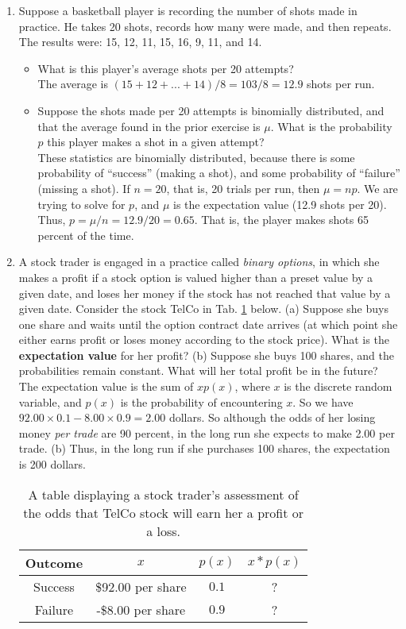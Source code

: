 \documentclass{article}
\begin{document}
\begin{enumerate}
\item Suppose a basketball player is recording the number of shots made in practice.  He takes 20 shots, records how many were made, and then repeats.  The results were: 15, 12, 11, 15, 16, 9, 11, and 14.
\begin{itemize}
\item What is this player's average shots per 20 attempts? \\ The average is $(15+12+ ... + 14)/8 = 103/8 = 12.9$ shots per run.
\item Suppose the shots made per 20 attempts is binomially distributed, and that the average found in the prior exercise is $\mu$.  What is the probability $p$ this player makes a shot in a given attempt? \\ These statistics are binomially distributed, because there is some probability of ``success'' (making a shot), and some probability of ``failure'' (missing a shot).  If $n=20$, that is, 20 trials per run, then $\mu = np$.  We are trying to solve for $p$, and $\mu$ is the expectation value (12.9 shots per 20).  Thus, $p = \mu/n = 12.9/20 = 0.65$.  That is, the player makes shots 65 percent of the time.
\end{itemize}
\item A stock trader is engaged in a practice called \textit{binary options}, in which she makes a profit if a stock option is valued higher than a preset value by a given date, and loses her money if the stock has not reached that value by a given date.  Consider the stock TelCo in Tab. \ref{tab:stock} below.  (a) Suppose she buys one share and waits until the option contract date arrives (at which point she either earns profit or loses money according to the stock price).  What is the \textbf{expectation value} for her profit? (b) Suppose she buys 100 shares, and the probabilities remain constant.  What will her total profit be in the future? \\
The expectation value is the sum of $xp(x)$, where $x$ is the discrete random variable, and $p(x)$ is the probability of encountering $x$.  So we have $92.00 \times 0.1 - 8.00 \times 0.9 = 2.00$ dollars.  So although the odds of her losing money \textit{per trade} are 90 percent, in the long run she expects to make 2.00 per trade.  (b) Thus, in the long run if she purchases 100 shares, the expectation is 200 dollars.
\begin{table}
\centering
\begin{tabular}{| c | c | c | c |}
\hline
\textbf{Outcome} & $x$ & $p(x)$ & $x*p(x)$ \\ \hline \hline
Success & \$92.00 per share & $0.1$ & ? \\ \hline
Failure & -\$8.00 per share & $0.9$ & ? \\ \hline
\hline
\end{tabular}
\caption{\label{tab:stock} A table displaying a stock trader's assessment of the odds that TelCo stock will earn her a profit or a loss.}
\end{table}
\end{enumerate}
\end{document}
